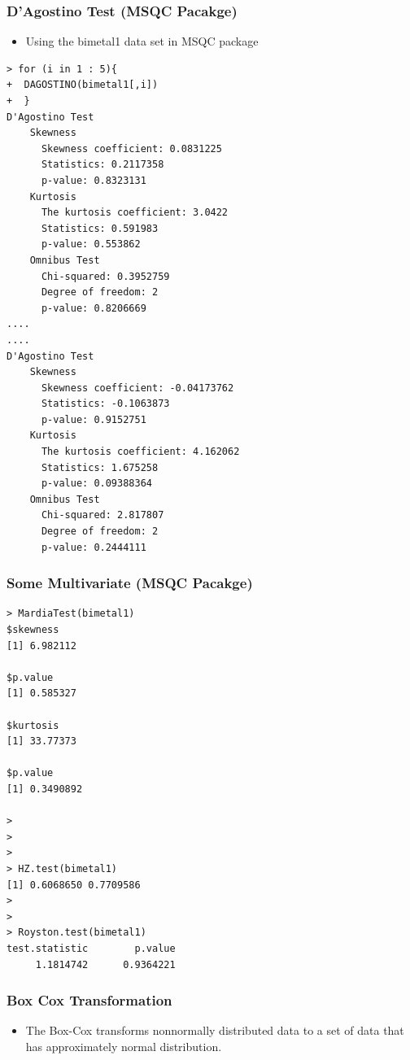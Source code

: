 \documentclass[]{article}
\begin{document}
\subsubsection{D'Agostino Test (MSQC Pacakge)}
\begin{itemize}
\item Using the bimetal1 data set in MSQC package
\end{itemize}
\begin{framed}
\begin{verbatim}
> for (i in 1 : 5){
+  DAGOSTINO(bimetal1[,i])
+  }
D'Agostino Test
    Skewness
      Skewness coefficient: 0.0831225 
      Statistics: 0.2117358 
      p-value: 0.8323131 
    Kurtosis
      The kurtosis coefficient: 3.0422 
      Statistics: 0.591983 
      p-value: 0.553862 
    Omnibus Test
      Chi-squared: 0.3952759 
      Degree of freedom: 2
      p-value: 0.8206669 
....
....
D'Agostino Test
    Skewness
      Skewness coefficient: -0.04173762 
      Statistics: -0.1063873 
      p-value: 0.9152751 
    Kurtosis
      The kurtosis coefficient: 4.162062 
      Statistics: 1.675258 
      p-value: 0.09388364 
    Omnibus Test
      Chi-squared: 2.817807 
      Degree of freedom: 2
      p-value: 0.2444111 
\end{verbatim}
\end{framed}
\newpage
\subsubsection{Some Multivariate (MSQC Pacakge)}
\begin{framed}
\begin{verbatim}
> MardiaTest(bimetal1)
$skewness
[1] 6.982112

$p.value
[1] 0.585327

$kurtosis
[1] 33.77373

$p.value
[1] 0.3490892

> 
>
>
> HZ.test(bimetal1)
[1] 0.6068650 0.7709586
> 
> 
> Royston.test(bimetal1)
test.statistic        p.value 
     1.1814742      0.9364221 
\end{verbatim}
\end{framed}




\subsubsection{Box Cox Transformation}
\begin{itemize}
\item The Box-Cox transforms nonnormally distributed data to a set of  data that has approximately normal distribution. 
\end{itemize}
\newpage
\end{document}
